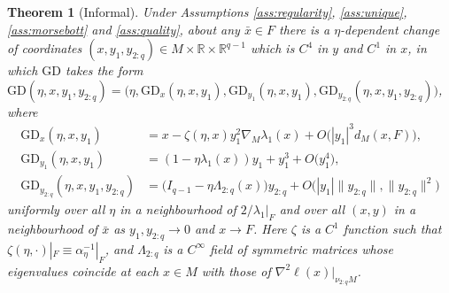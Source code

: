 \documentclass{article}
\newcommand{\RB}{\mathbb{R}}
\newcommand{\GD}{\mathrm{GD}}
\theoremstyle{plain}
\newtheorem{theorem}{Theorem}[section]
\theoremstyle{definition}
\theoremstyle{remark}
\begin{document}
\begin{theorem}[Informal]\label{thm:normalformmain}
    Under Assumptions \ref{ass:regularity}, \ref{ass:unique}, \ref{ass:morsebott} and \ref{ass:quality}, about any $\bar{x}\in F$ there is a $\eta$-dependent change of coordinates $(x,y_1,y_{2:q})\in M\times \RB\times\RB^{q-1}$ which is $C^4$ in $y$ and $C^1$ in $x$, in which $\GD$ takes the form $\GD(\eta,x,y_1,y_{2:q}) = \big(\eta,\GD_x(\eta,x,y_1),\GD_{y_1}(\eta,x,y_1),\GD_{y_{2:q}}(\eta,x,y_1,y_{2:q})\big)$, where
    \begin{align}
    \GD_x(\eta,x,y_1) &= x - \zeta(\eta,x)y_1^2\nabla_M\lambda_1(x) + O\big(|y_1|^3d_M(x,F)\big),
\\
    \GD_{y_1}(\eta,x,y_1) &= (1-\eta\lambda_1(x))y_1 +  y_1^3 + O\big( y_1^4\big),
  \\
    \GD_{y_{2:q}}(\eta,x,y_1,y_{2:q}) &= \big(I_{q-1}-\eta \Lambda_{2:q}(x)\big)y_{2:q} + O\big(|y_1|\|y_{2:q}\|,\|y_{2:q}\|^2\big)
    \end{align}
    uniformly over all $\eta$ in a neighbourhood of $2/\lambda_1|_F$ and over all $(x,y)$ in a neighbourhood of $\bar{x}$ as $y_1,y_{2:q}\rightarrow 0$ and $x\rightarrow F$. Here $\zeta$ is a $C^1$ function such that $\zeta(\eta,\cdot)|_F\equiv \alpha_{\eta}^{-1}|_F$, and $\Lambda_{2:q}$ is a $C^{\infty}$ field of symmetric matrices whose eigenvalues coincide at each $x\in M$ with those of $\nabla^2\ell(x)|_{\nu_{2:q}M}$.
\end{theorem}
\end{document}
